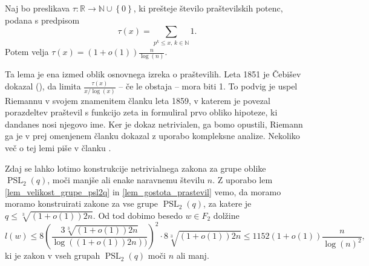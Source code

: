     \begin{lema}
    \label{lem_gostota_prastevil}
    Naj bo preslikava $\tau : \mathbb{R} \to \mathbb{N} \cup \left\{ 0\right\}$, ki prešteje število praštevilskih potenc, podana s predpisom \begin{equation*}
    \tau(x) = \sum_{p^{k} \le x, \, k \in \mathbb{N}} 1.
    \end{equation*}  
     Potem velja $\tau(x) = (1 + o(1)) \frac{n}{\log(n)}$.     
    \end{lema}
    Ta lema je ena izmed oblik osnovnega izreka o praštevilih. Leta     1851 je Čebišev dokazal (\cite[str.~4--5]{Granville_1993}), da limita $\frac{\tau(x)}{x / \log(x)}$ -- če le obstaja -- mora biti 1. To podvig je uspel Riemannu v svojem znamenitem članku \cite{Riemann_1859} leta 1859, v katerem je povezal porazdeltev praštevil s funkcijo zeta in formuliral prvo obliko hipoteze, ki dandanes nosi njegovo ime.
    Ker je dokaz netrivialen, ga bomo opustili, Riemann ga je v prej omenjenem članku dokazal z uporabo kompleksne analize. 
    Nekoliko več o tej lemi piše v članku \cite{Kozma_Thom_2016}.            
   
    Zdaj se lahko lotimo konstrukcije netrivialnega zakona za grupe oblike $\operatorname{PSL}_2(q)$, moči manjše ali enake naravnemu številu $n$. Z uporabo lem \ref{lem_velikost_grupe_psl2q} in \ref{lem_gostota_prastevil}
    vemo, da moramo moramo konstruirati zakone za vse grupe $\operatorname{PSL}_2(q)$, za katere je $q \le \sqrt[3]{(1 + o(1)) 2n}$. Od tod dobimo besedo $w \in F_2$ dolžine \begin{equation*}
    l(w) \le 8 \left( \frac{3 \sqrt[3]{(1 + o(1)) 2n}}{\log((1 + o(1)) 2n))}  \right)^2 \cdot 8 \sqrt[3]{(1 + o(1)) 2n} \le 1152 (1 + o(1)) \frac{n}{\log(n)^2},
    \end{equation*}  
    ki je zakon v vseh grupah $\operatorname{PSL}_2(q)$ moči $n$ ali manj. 
    


